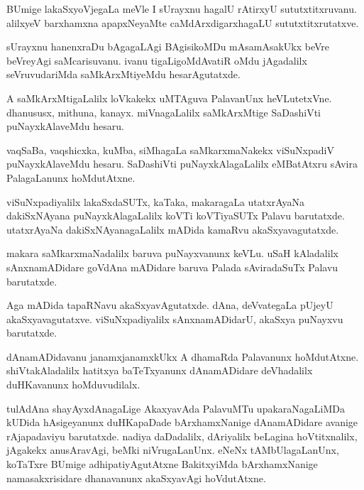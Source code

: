 \documentclass{article}
\begin{document}
\begin{mng}%
BUmige lakaSxyoVjegaLa meVle I sUrayxnu hagalU rAtirxyU sututxtitxruvanu. alilxyeV barxhamxna 
apapxNeyaMte caMdArxdigarxhagaLU sututxtitxrutatxve.
\end{mng}

\begin{mng}%
sUrayxnu hanenxraDu bAgagaLAgi BAgisikoMDu mAsamAsakUkx beVre beVreyAgi saMcarisuvanu. ivanu 
tigaLigoMdAvatiR oMdu jAgadalilx seVruvudariMda saMkArxMtiyeMdu hesarAgutatxde.
\end{mng}

\begin{mng}%
A saMkArxMtigaLalilx loVkakekx uMTAguva PalavanUnx heVLutetxVne. dhanususx, mithuna, kanayx. 
miVnagaLalilx saMkArxMtige SaDashiVti puNayxkAlaveMdu hesaru.
\end{mng}

\begin{mng}%
vaqSaBa, vaqshicxka, kuMba, siMhagaLa saMkarxmaNakekx viSuNxpadiV puNayxkAlaveMdu hesaru. 
SaDashiVti puNayxkAlagaLalilx eMBatAtxru sAvira PalagaLanunx hoMdutAtxne.
\end{mng}

\begin{mng}%
viSuNxpadiyalilx lakaSxdaSUTx, kaTaka, makaragaLa utatxrAyaNa dakiSxNAyana puNayxkAlagaLalilx 
koVTi koVTiyaSUTx Palavu barutatxde. utatxrAyaNa dakiSxNAyanagaLalilx mADida kamaRvu 
akaSxyavagutatxde.
\end{mng}

\begin{mng}%
makara saMkarxmaNadalilx baruva puNayxvanunx keVLu. uSaH kAladalilx sAnxnamADidare goVdAna 
mADidare baruva Palada sAviradaSuTx Palavu barutatxde.
\end{mng}

\begin{mng}%
Aga mADida tapaRNavu akaSxyavAgutatxde. dAna, deVvategaLa pUjeyU akaSxyavagutatxve. 
viSuNxpadiyalilx sAnxnamADidarU, akaSxya puNayxvu barutatxde.
\end{mng}

\begin{mng}%
dAnamADidavanu janamxjanamxkUkx A dhamaRda Palavanunx hoMdutAtxne. shiVtakAladalilx hatitxya 
baTeTxyanunx dAnamADidare deVhadalilx duHKavanunx hoMduvudilalx.
\end{mng}

\begin{mng}%
tulAdAna shayAyxdAnagaLige AkaxyavAda PalavuMTu upakaraNagaLiMDa kUDida hAsigeyanunx duHKapaDade 
bArxhamxNanige dAnamADidare avanige rAjapadaviyu barutatxde. nadiya daDadalilx, dAriyalilx 
beLagina hoVtitxnalilx, jAgakekx anusAravAgi, beMki niVrugaLanUnx. eNeNx tAMbUlagaLanUnx, 
koTaTxre BUmige adhipatiyAgutAtxne BakitxyiMda bArxhamxNanige namasakxrisidare dhanavanunx 
akaSxyavAgi hoVdutAtxne.
\end{mng}
\end{document}

